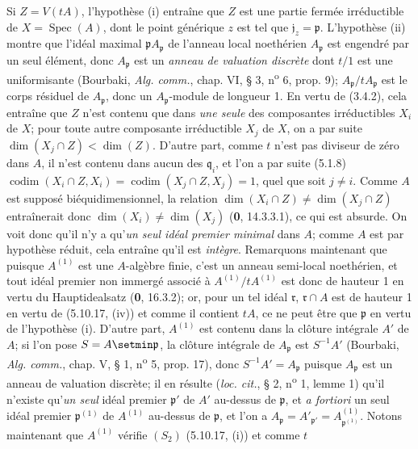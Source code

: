 Si $Z=V(tA)$, l'hypothèse (i) entraîne que $Z$ est une partie fermée
irréductible de $X=\operatorname{Spec}(A)$, dont le point générique $z$ est tel
que $\mathfrak j_z=\mathfrak p$. L'hypothèse (ii) montre que l'idéal maximal
$\mathfrak pA_{\mathfrak p}$ de l'anneau local noethérien $A_{\mathfrak p}$
est engendré par un seul élément, donc $A_{\mathfrak p}$ est un \emph{anneau de
valuation discrète} dont $t/1$ est une uniformisante (Bourbaki, \emph{Alg.
comm.}, chap. VI, § 3, n\textsuperscript{o} 6, prop. 9);
$A_{\mathfrak p}/tA_{\mathfrak p}$ est le corps résiduel de
$A_{\mathfrak p}$, donc un $A_{\mathfrak p}$-module de longueur 1. En vertu de
(3.4.2), cela entraîne que $Z$ n'est contenu que dans \emph{une seule} des composantes
irréductibles $X_i$ de $X$; pour toute autre composante irréductible $X_j$ de
$X$, on a par suite $\dim(X_j\cap Z)<\dim(Z)$. D'autre part, comme $t$ n'est
pas diviseur de zéro dans $A$, il n'est contenu dans aucun des
$\mathfrak q_i$, et l'on a par suite (5.1.8)
$\operatorname{codim}(X_i\cap Z,X_i)
=\operatorname{codim}(X_j\cap Z,X_j)=1$,
quel que soit $j\neq i$. Comme $A$ est supposé biéquidimensionnel, la relation
$\dim(X_i\cap Z)\neq\dim(X_j\cap Z)$ entraînerait donc
$\dim(X_i)\neq\dim(X_j)$ (\textbf{0}, 14.3.3.1), ce qui est absurde. On voit donc qu'il
n'y a qu'\emph{un seul idéal premier minimal} dans $A$; comme $A$ est par hypothèse
réduit, cela entraîne qu'il est \emph{intègre}. Remarquons maintenant que puisque
$A^{(1)}$ est une $A$-algèbre finie, c'est un anneau semi-local noethérien, et
tout idéal premier non immergé associé à $A^{(1)}/tA^{(1)}$ est donc de
hauteur 1 en vertu du Hauptidealsatz (\textbf{0}, 16.3.2); or, pour un tel idéal
$\mathfrak r$, $\mathfrak r\cap A$ est de hauteur 1 en vertu de (5.10.17,
(iv)) et comme il contient $tA$, ce ne peut être que $\mathfrak p$ en vertu de
l'hypothèse (i). D'autre part, $A^{(1)}$ est contenu dans la clôture intégrale
$A'$ de $A$; si l'on pose $S=A\setmin\mathfrak p$, la clôture intégrale de
$A_{\mathfrak p}$ est $S^{-1}A'$ (Bourbaki, \emph{Alg. comm.}, chap. V, § 1,
n\textsuperscript{o} 5, prop. 17), donc $S^{-1}A'=A_{\mathfrak p}$ puisque
$A_{\mathfrak p}$ est un anneau de valuation discrète; il en résulte
(\emph{loc. cit.}, § 2, n\textsuperscript{o} 1, lemme 1) qu'il n'existe qu'\emph{un
seul} idéal premier $\mathfrak p'$ de $A'$ au-dessus de $\mathfrak p$, et \emph{a
fortiori} un seul idéal premier $\mathfrak p^{(1)}$ de $A^{(1)}$ au-dessus de
$\mathfrak p$, et l'on a
$A_{\mathfrak p}=A'_{\mathfrak p'}
=A^{(1)}_{\mathfrak p^{(1)}}$.
Notons maintenant que $A^{(1)}$ vérifie $(S_2)$ (5.10.17, (i)) et comme $t$

